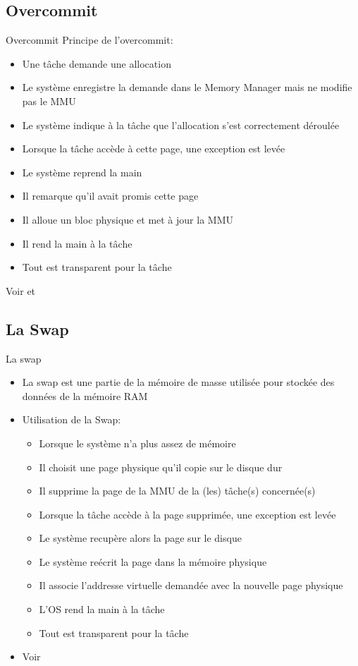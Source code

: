 \subsection{Overcommit}

\begin{frame}{Overcommit}
  Principe de l'overcommit:
  \begin{itemize}
  \item Une tâche demande une allocation
  \item Le système  enregistre la demande dans le  Memory Manager mais
    ne modifie pas le MMU
  \item  Le  système  indique   à  la  tâche  que  l'allocation  s'est
    correctement déroulée
  \item Lorsque la tâche accède à cette page, une exception est levée
  \item Le système reprend la main
  \item Il remarque qu'il avait promis cette page
  \item Il alloue un bloc physique et met à jour la MMU
  \item Il rend la main à la tâche
  \item Tout est transparent pour la tâche
  \end{itemize}
  Voir                         et
\end{frame}

\subsection{La Swap}

\begin{frame}{La swap}
  \begin{itemize}
  \item La  swap est une partie  de la mémoire de  masse utilisée pour
    stockée des données de la mémoire RAM
  \item Utilisation de la Swap:
  \begin{itemize}
  \item Lorsque le système n'a plus assez de mémoire
  \item Il choisit une page physique qu'il copie sur le disque dur
  \item  Il  supprime  la  page   de  la  MMU  de  la  (les)  tâche(s)
    concernée(s)
  \item Lorsque la tâche accède à la page supprimée, une exception est
    levée
  \item Le système recupère alors la page sur le disque
  \item Le système reécrit la page dans la mémoire physique
  \item Il associe l'addresse virtuelle demandée avec la nouvelle page
    physique
  \item L'OS rend la main à la tâche
  \item Tout est transparent pour la tâche
  \end{itemize}
\item Voir 
\end{itemize}
\end{frame}

